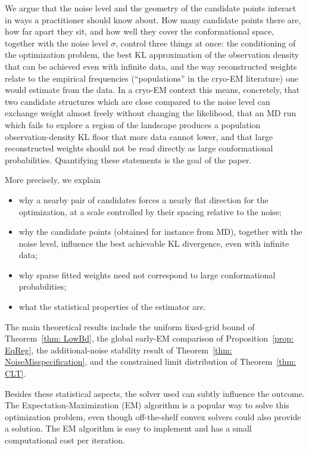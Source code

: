 \documentclass[12pt]{iopart}
\theoremstyle{remark}
\begin{document}
We argue that the noise level and the geometry of the candidate points
interact in ways a practitioner should know about. How many candidate
points there are, how far apart they sit, and how well they cover the
conformational space, together with the noise level $\sigma$, control three things
at once: the conditioning of the optimization problem, the best
KL approximation of the observation density that can be achieved
even with infinite data, and the
way reconstructed weights relate to the empirical frequencies (``populations'' in the cryo-EM literature) one would
estimate from the data. In a cryo-EM context this means, concretely, that two
candidate structures which are close compared to the noise level can
exchange weight almost freely without changing the likelihood, that an
MD run which fails to explore a region of the landscape
produces a population observation-density KL floor that more data cannot
lower, and that
large reconstructed weights should not be read directly as large
conformational probabilities. Quantifying these statements is the goal of
the paper.

More precisely, we explain
\begin{itemize}
    \item why a nearby pair of candidates forces a nearly flat
    direction for the optimization, at a scale controlled by their spacing relative to the noise;
    \item why the candidate points (obtained for instance from MD), together with the noise level, influence the best achievable
     KL divergence, even with infinite data;
    \item why sparse fitted weights need not correspond to large conformational probabilities;
    \item what the statistical properties of the estimator are.
\end{itemize}

The main theoretical results include the uniform fixed-grid bound of
Theorem~\ref{thm: LowBd}, the global early-EM comparison of
Proposition~\ref{prop: EqReg}, the additional-noise stability result of
Theorem~\ref{thm: NoiseMisspecification}, and the constrained limit
distribution of Theorem~\ref{thm: CLT}.

Besides these statistical aspects, the solver used can subtly influence the outcome.   The Expectation-Maximization (EM) algorithm is a popular way to solve this
optimization problem, even though off-the-shelf convex solvers could also provide a solution. The EM algorithm is easy to implement and has a small computational cost per iteration.
\end{document}

